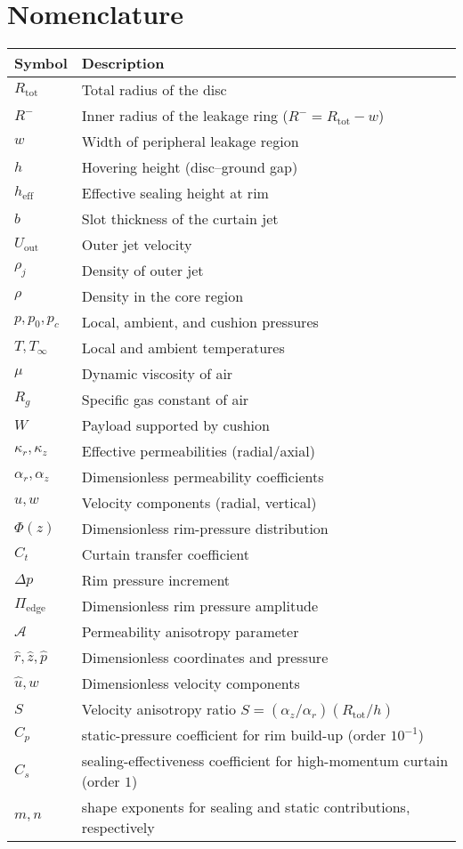 \documentclass[11pt,a4paper]{article}
\begin{document}
\section{Nomenclature}
\begin{tabular}{@{}ll@{}}
\toprule
Symbol & Description \\ \midrule
$R_{\mathrm{tot}}$ & Total radius of the disc \\
$R^{-}$ & Inner radius of the leakage ring ($R^{-}=R_{\mathrm{tot}}-w$) \\
$w$ & Width of peripheral leakage region \\
$h$ & Hovering height (disc--ground gap) \\
$h_{\mathrm{eff}}$ & Effective sealing height at rim \\
$b$ & Slot thickness of the curtain jet \\
$U_{\mathrm{out}}$ & Outer jet velocity \\
$\rho_j$ & Density of outer jet \\
$\rho$ & Density in the core region \\
$p,p_0,p_c$ & Local, ambient, and cushion pressures \\
$T,T_\infty$ & Local and ambient temperatures \\
$\mu$ & Dynamic viscosity of air \\
$R_g$ & Specific gas constant of air \\
$W$ & Payload supported by cushion \\
$\kappa_r,\kappa_z$ & Effective permeabilities (radial/axial) \\
$\alpha_r,\alpha_z$ & Dimensionless permeability coefficients \\
$u,w$ & Velocity components (radial, vertical) \\
$\Phi(z)$ & Dimensionless rim-pressure distribution \\
$C_t$ & Curtain transfer coefficient \\
$\Delta p$ & Rim pressure increment \\
$\Pi_{\mathrm{edge}}$ & Dimensionless rim pressure amplitude \\
$\mathcal{A}$ & Permeability anisotropy parameter \\
$\hat r,\hat z,\hat p$ & Dimensionless coordinates and pressure \\
$\hat u,\hat w$ & Dimensionless velocity components \\
$S$ & Velocity anisotropy ratio $S=(\alpha_z/\alpha_r)(R_{\mathrm{tot}}/h)$ \\ \bottomrule
$C_p$ & static-pressure coefficient for rim build-up (order $10^{-1}$)\\
$C_s$ & sealing-effectiveness coefficient for high-momentum curtain (order $1$)\\
$m,n$ & shape exponents for sealing and static contributions, respectively\\
\end{tabular}
\end{document}
